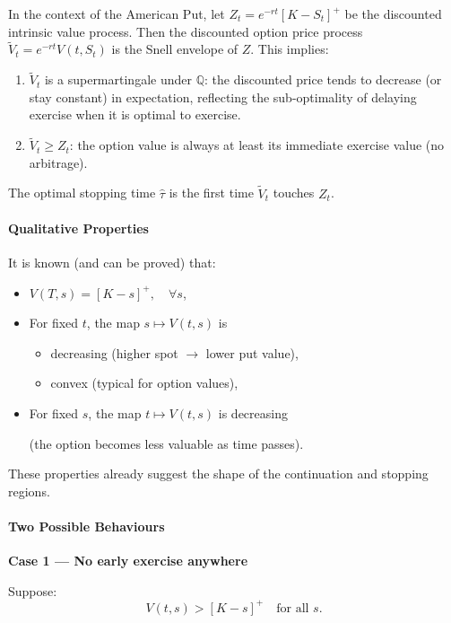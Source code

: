 \documentclass[12pt,a4paper]{article}
\theoremstyle{definition}
\begin{document}
In the context of the American Put, let $Z_t = e^{-rt} [K - S_t]^+$ be the discounted intrinsic value process. Then the discounted option price process $\tilde{V}_t = e^{-rt} V(t, S_t)$ is the Snell envelope of $Z$.
This implies:
\begin{enumerate}
    \item $\tilde{V}_t$ is a supermartingale under $\mathbb{Q}$: the discounted price tends to decrease (or stay constant) in expectation, reflecting the sub-optimality of delaying exercise when it is optimal to exercise.
    \item $\tilde{V}_t \geq Z_t$: the option value is always at least its immediate exercise value (no arbitrage).
\end{enumerate}
The optimal stopping time $\hat \tau$ is the first time $\tilde{V}_t$ touches $Z_t$.

\paragraph{Qualitative Properties}

It is known (and can be proved) that:

\begin{itemize}
\item $V(T, s) = [K - s]^+, \quad \forall s$,

\item For fixed $t$, the map $s \mapsto V(t, s)$ is

\begin{itemize}
\item decreasing (higher spot $\to$ lower put value),
\item convex (typical for option values),
\end{itemize}

\item For fixed $s$, the map $t \mapsto V(t, s)$ is decreasing

(the option becomes less valuable as time passes).
\end{itemize}

These properties already suggest the shape of the continuation and stopping regions.

\paragraph{Two Possible Behaviours}

\textbf{Case 1 --- No early exercise anywhere}

Suppose:
\[
V(t, s) > [K - s]^+ \quad \text{for all } s.
\]
\end{document}
